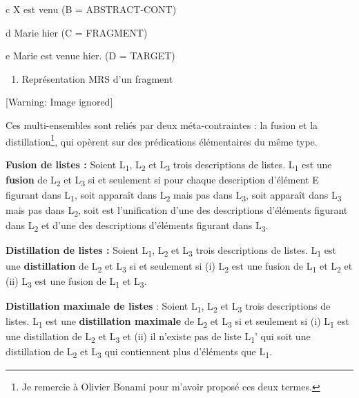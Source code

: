   c  X est venu (B = ABSTRACT-CONT)

  d  Marie hier (C = FRAGMENT)

  e  Marie est venue hier. (D = TARGET)


\begin{enumerate}
\item \label{bkm:Ref290580103}Représentation MRS d'un fragment


\end{enumerate}
  [Warning: Image ignored] %
 

Ces multi-ensembles sont reliés par deux méta-contraintes : la fusion et la distillation\footnote{Je remercie à Olivier Bonami pour m'avoir proposé ces deux termes.}, qui opèrent sur des prédications élémentaires du même type. 

\textbf{Fusion de listes :} Soient L\textsubscript{1}, L\textsubscript{2} et L\textsubscript{3} trois descriptions de listes. L\textsubscript{1} est une \textbf{fusion} de L\textsubscript{2} et L\textsubscript{3} si et seulement si pour chaque description d'élément E\textsubscript{} figurant dans L\textsubscript{1}, soit apparaît dans L\textsubscript{2} mais pas dans L\textsubscript{3}, soit  apparaît dans L\textsubscript{3} mais pas dans L\textsubscript{2}, soit est l'unification d'une des descriptions d'éléments figurant dans L\textsubscript{2} et d'une des descriptions d'éléments figurant dans L\textsubscript{3}.

\textbf{Distillation de listes :} Soient L\textsubscript{1}, L\textsubscript{2} et L\textsubscript{3} trois descriptions de listes. L\textsubscript{1} est une \textbf{distillation} de L\textsubscript{2} et L\textsubscript{3} si et seulement si (i) L\textsubscript{2} est une fusion de L\textsubscript{1} et L\textsubscript{2} et (ii) L\textsubscript{3} est une fusion de L\textsubscript{1} et L\textsubscript{3}.

\textbf{Distillation maximale de listes} : Soient L\textsubscript{1}, L\textsubscript{2} et L\textsubscript{3} trois descriptions de listes. L\textsubscript{1} est une \textbf{distillation maximale} de L\textsubscript{2} et L\textsubscript{3} si et seulement si (i) L\textsubscript{1} est une distillation de L\textsubscript{2} et L\textsubscript{3} et (ii) il n'existe pas de liste L\textsubscript{1}' qui soit une distillation de L\textsubscript{2} et L\textsubscript{3} qui contiennent plus d'éléments que L\textsubscript{1}.


